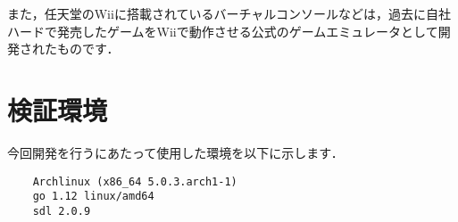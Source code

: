 また，任天堂のWiiに搭載されているバーチャルコンソールなどは，過去に自社ハードで発売したゲームをWiiで動作させる公式のゲームエミュレータとして開発されたものです．

\section{検証環境}
今回開発を行うにあたって使用した環境を以下に示します．
\begin{verbatim}
    Archlinux (x86_64 5.0.3.arch1-1)
    go 1.12 linux/amd64
    sdl 2.0.9
\end{verbatim}

